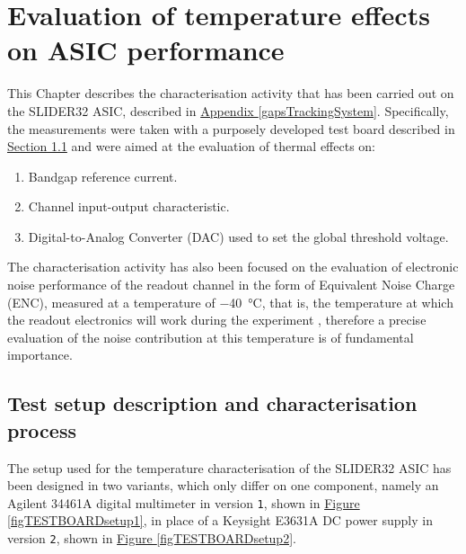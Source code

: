 \chapter{Evaluation of temperature effects on ASIC performance} \label{ch1}

This Chapter describes the characterisation activity that has been carried out on the SLIDER32 ASIC, described in \hyperref[gapsTrackingSystem]{Appendix \ref{gapsTrackingSystem}}. Specifically, the measurements were taken with a purposely developed test board described in \hyperref[testboardsetup]{Section \ref{testboardsetup}} and were aimed at the evaluation of thermal effects on:

\begin{enumerate}
    \itemsep0em 
    \item Bandgap reference current.
    \item Channel input-output characteristic.
    \item Digital-to-Analog Converter (DAC) used to set the global threshold voltage.
\end{enumerate}

\par
The characterisation activity has also been focused on the evaluation of electronic noise performance of the readout channel in the form of Equivalent Noise Charge (ENC), measured at a temperature of \SI{-40}{\celsius}, that is, the temperature at which the readout electronics will work during the experiment \cite{re_2022_a}, therefore a precise evaluation of the noise contribution at this temperature is of fundamental importance.


\section[Test setup description and characterisation process]{Test setup description and characterisation\\ process} \label{testboardsetup}

The setup used for the temperature characterisation of the SLIDER32 ASIC has been designed in two variants, which only differ on one component, namely an Agilent 34461A digital multimeter in version \texttt{1}, shown in \hyperref[figTESTBOARDsetup1]{Figure \ref{figTESTBOARDsetup1}}, in place of a Keysight E3631A DC power supply in version \texttt{2}, shown in \hyperref[figTESTBOARDsetup2]{Figure \ref{figTESTBOARDsetup2}}.

